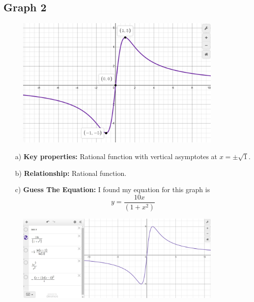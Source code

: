 \documentclass{article}
\begin{document}
\subsection{Graph 2}
\begin{figure}[h]
    \centering
    \includegraphics[width=0.9\textwidth]{imgs/imgs FSE/g_2.png}
    \label{fig:image}
\end{figure}

\begin{enumerate}
    \item[a)] \textbf{Key properties:} Rational function with vertical asymptotes at $x = \pm \sqrt{1}$.
    \item[b)]  \textbf{Relationship:} Rational function.
    \item[c)] \textbf{Guess The Equation: } I found my equation for this graph is $$y=\frac{10x}{(1+x^{2})}$$
\end{enumerate}

\begin{figure}[h]
    \centering
    \includegraphics[width=0.9\textwidth]{imgs/imgs FSE/10x_(1+x^2).png}
    \label{fig:image}
\end{figure}
\newpage 
\end{document}
